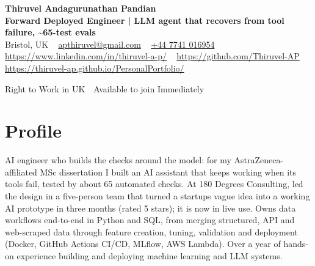 \documentclass[a4paper,11pt]{article}
\begin{document}
\begin{center}
  {\LARGE\bfseries Thiruvel Andagurunathan Pandian} \\[3pt]
  {\color{headernavy}\small\textbf{Forward Deployed Engineer | LLM agent that recovers from tool failure, \textasciitilde{}65-test evals}} \\[3pt]
  {\small
  Bristol, UK\nobreak\ \,\textbar\, \href{mailto:apthiruvel@gmail.com}{apthiruvel@gmail.com}\nobreak\ \,\textbar\, \href{tel:+447741016954}{+44 7741 016954}\nobreak\ \,\textbar\, \href{https://www.linkedin.com/in/thiruvel-a-p/}{https://www.linkedin.com/in/thiruvel-a-p/}\nobreak\ \,\textbar\, \href{https://github.com/Thiruvel-AP}{https://github.com/Thiruvel-AP}\nobreak\ \,\textbar\, \href{https://thiruvel-ap.github.io/PersonalPortfolio/}{https://thiruvel-ap.github.io/PersonalPortfolio/}}\par\vspace{4pt}
  \noindent{} Right to Work in UK \,\textbar\, Available to join Immediately
\end{center}

\section{Profile}
AI engineer who builds the checks around the model: for my AstraZeneca-affiliated MSc dissertation I built an AI assistant that keeps working when its tools fail, tested by about 65 automated checks. At 180 Degrees Consulting, led the design in a five-person team that turned a startup\textquotesingle{}s vague idea into a working AI prototype in three months (rated 5 stars); it is now in live use. Owns data workflows end-to-end in Python and SQL, from merging structured, API and web-scraped data through feature creation, tuning, validation and deployment (Docker, GitHub Actions CI/CD, MLflow, AWS Lambda). Over a year of hands-on experience building and deploying machine learning and LLM systems.
\end{document}

